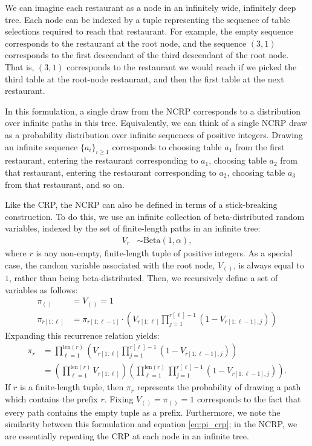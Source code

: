 \documentclass{article}
\newcommand{\len}{\mathrm{len}}
\begin{document}
We can imagine each restaurant as a node in an infinitely wide, infinitely deep tree.
Each node can be indexed by a tuple representing the sequence of table selections required to reach that restaurant.
For example, the empty sequence corresponds to the restaurant at the root node, and the sequence $(3, 1)$ corresponds to the first descendant of the third descendant of the root node.
That is, $(3, 1)$ corresponds to the restaurant we would reach if we picked the third table at the root-node restaurant, and then the first table at the next restaurant.

In this formulation, a single draw from the NCRP corresponds to a distribution over infinite paths in this tree.
Equivalently, we can think of a single NCRP draw as a probability distribution over infinite sequences of positive integers.
Drawing an infinite sequence $\{a_i\}_{i \geq 1}$ corresponds to choosing table $a_1$ from the first restaurant, entering the restaurant corresponding to $a_1$, choosing table $a_2$ from that restaurant, entering the restaurant corresponding to $a_2$, choosing table $a_3$ from that restaurant, and so on.

Like the CRP, the NCRP can also be defined in terms of a stick-breaking construction.
To do this, we use an infinite collection of beta-distributed random variables, indexed by the set of finite-length paths in an infinite tree:
\begin{align}
V_r &\sim \text{Beta}(1, \alpha),
\end{align}
where $r$ is any non-empty, finite-length tuple of positive integers.
As a special case, the random variable associated with the root node, $V_{()}$, is always equal to $1$, rather than being beta-distributed.
Then, we recursively define a set of variables as follows:
\begin{align}
\pi_{()} &= V_{()} = 1 \\
\pi_{r[1:\ell]} &= \pi_{r[1:\ell-1]} \cdot \left( V_{r[1:\ell]} \prod_{j=1}^{r[\ell]-1} (1-V_{r[1:\ell-1],j}) \right)
\end{align}
Expanding this recurrence relation yields:
\begin{align}
\pi_r
&= \prod_{\ell = 1}^{\len(r)} \left( V_{r[1:\ell]} \prod_{j=1}^{r[\ell]-1} \left( 1 - V_{r[1:\ell-1],j} \right) \right) \\
&= \left( \prod_{\ell = 1}^{\len(r)} V_{r[1:\ell]} \right) \left( \prod_{\ell = 1}^{\len(r)} \prod_{j=1}^{r[\ell]-1} \left( 1 - V_{r[1:\ell-1],j} \right) \right).
\end{align}
If $r$ is a finite-length tuple, then $\pi_r$ represents the probability of drawing a path which contains the prefix $r$.
Fixing $V_{()} = \pi_{()} = 1$ corresponds to the fact that every path contains the empty tuple as a prefix.
Furthermore, we note the similarity between this formulation and equation \eqref{eq:pi_crp}; in the NCRP, we are essentially repeating the CRP at each node in an infinite tree.
\end{document}
